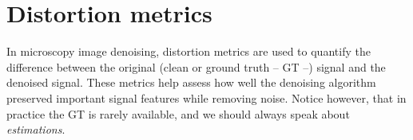 \documentclass{article}
\begin{document}






\section{Distortion metrics}

In microscopy image denoising, distortion metrics are used to quantify
the difference between the original (clean or ground truth -- GT --)
signal and the denoised signal. These metrics help assess how well the
denoising algorithm preserved important signal features while removing
noise. Notice however, that in practice the GT is rarely available, and
we should always speak about \emph{estimations}.
\end{document}
